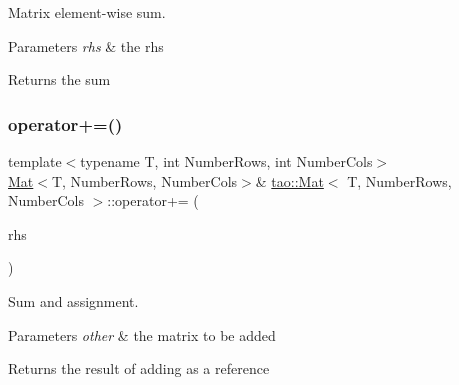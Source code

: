 Matrix element-\/wise sum. 


\begin{DoxyParams}{Parameters}
{\em rhs} & the rhs \\
\hline
\end{DoxyParams}
\begin{DoxyReturn}{Returns}
the sum 
\end{DoxyReturn}
\mbox{\label{classtao_1_1_mat_ab15d248a4f028f290670dd4ed1bdcb5c}} 
\subsubsection{\texorpdfstring{operator+=()}{operator+=()}}
{\footnotesize\ttfamily template$<$typename T, int Number\+Rows, int Number\+Cols$>$ \\
\mbox{\hyperlink{classtao_1_1_mat}{Mat}}$<$T, Number\+Rows, Number\+Cols$>$\& \mbox{\hyperlink{classtao_1_1_mat}{tao\+::\+Mat}}$<$ T, Number\+Rows, Number\+Cols $>$\+::operator+= (\begin{DoxyParamCaption}\item[{const \mbox{\hyperlink{classtao_1_1_mat}{Mat}}$<$ T, Number\+Rows, Number\+Cols $>$ \&}]{rhs }\end{DoxyParamCaption})\hspace{0.3cm}{\ttfamily [inline]}}



Sum and assignment. 


\begin{DoxyParams}{Parameters}
{\em other} & the matrix to be added \\
\hline
\end{DoxyParams}
\begin{DoxyReturn}{Returns}
the result of adding as a reference 
\end{DoxyReturn}
\mbox{\label{classtao_1_1_mat_a63968580e28124e87e38244aa29263e5}} 

